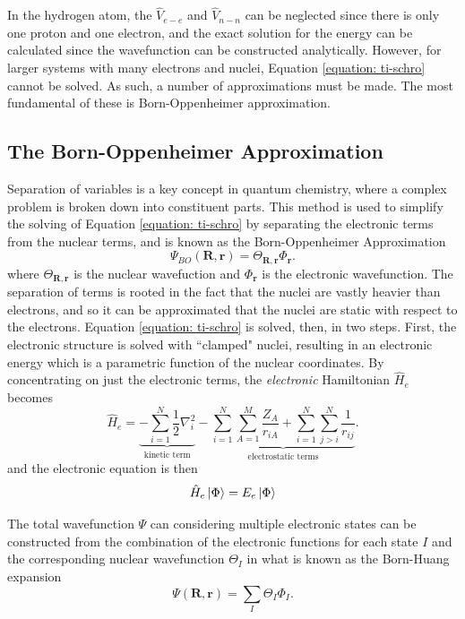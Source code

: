 In the hydrogen atom, the $\hat{V}_{e-e}$ and $\hat{V}_{n-n}$ can be neglected since there is only one proton and one electron, and the exact solution for the energy can be calculated since the wavefunction can be constructed analytically. However, for larger systems with many electrons and nuclei, Equation \ref{equation: ti-schro} cannot be solved. As such, a number of approximations must be made. The most fundamental of these is Born-Oppenheimer approximation.
\subsection{The Born-Oppenheimer Approximation}\label{section: QM_bornoppenheimer}
Separation of variables is a key concept in quantum chemistry, where a complex problem is broken down into constituent parts. This method is used to simplify the solving of Equation \ref{equation: ti-schro} by separating the electronic terms from the nuclear terms, and is known as the Born-Oppenheimer Approximation\cite{Born1927}
\begin{equation}
    \Psi_{BO}(\bm{R},\bm{r})=\Theta_{\bm{R},\bm{r}}\Phi_{\bm{r}}.
\end{equation}
where $\Theta_{\bm{R},\bm{r}}$ is the nuclear wavefuction and $\Phi_{\bm{r}}$ is the electronic wavefunction. The separation of terms is rooted in the fact that the nuclei are vastly heavier than electrons, and so it can be approximated that the nuclei are static with respect to the electrons. Equation \ref{equation: ti-schro} is solved, then, in two steps. First, the electronic structure is solved with ``clamped" nuclei, resulting in an electronic energy which is a parametric function of the nuclear coordinates. By concentrating on just the electronic terms, the \textit{electronic} Hamiltonian $\hat{H}_{e}$ becomes
\begin{equation}\label{equation: Hel}
     \hat{H}_{e}=\underbrace{-\sum_{i=1}^{N}\frac{1}{2}\nabla_{i}^2}_\text{kinetic term}-\underbrace{\sum_{i=1}^{N}\sum_{A=1}^{M}\frac{Z_{A}}{r_{iA}}+\sum_{i=1}^{N}\sum_{j>{i}}^{N}\frac{1}{r_{ij}}}_\text{electrostatic terms}.
\end{equation}
and the electronic \schro{} equation is then
\begin{equation}\label{equation: ti-schro-el}
   \hat{H}_{e}\ket{\Phi}=E_{e}\ket{\Phi}
\end{equation}

The total wavefunction $\Psi$ can considering multiple electronic states can be constructed from the combination of the electronic functions for each state $I$ and the corresponding nuclear wavefunction $\Theta_{I}$ in what is known as the Born-Huang expansion\cite{Born1954}
\begin{equation}\label{equation: Born-Huang}
    \Psi(\bm{R},\bm{r})=\sum_{I}\Theta_{I}\Phi_{I}.
\end{equation}

